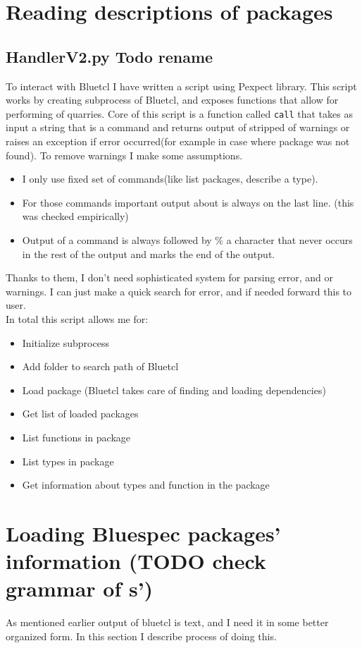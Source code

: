 \documentclass[14pt]{report}
\begin{document}
\section{Reading descriptions of packages}
\subsection{HandlerV2.py Todo rename}
To interact with Bluetcl I have written a script using Pexpect library. This script works by creating subprocess of Bluetcl, and exposes functions that allow for performing of quarries. Core of this script is a function called \verb!call! that takes as input a string that is a command and returns output of stripped of warnings or raises an exception if error occurred(for example in case where package was not found). To remove warnings I make some assumptions.
\begin{itemize}
    \item I only use fixed set of commands(like list packages, describe a type).
    \item For those commands important output about is always on the last line. (this was checked empirically)
    \item Output of a command is always followed by $\%$ a character that never occurs in the rest of the output and marks the end of the output.
\end{itemize}
Thanks to them, I don't need sophisticated system for parsing error, and or warnings. I can just make a quick search for error, and if needed forward this to user.
\\ 
In total this script allows me for:
\begin{itemize}
    \item Initialize subprocess
    \item Add folder to search path of Bluetcl
    \item Load package (Bluetcl takes care of finding and loading dependencies)
    \item Get list of loaded packages
    \item List functions in package
    \item List types in package
    \item Get information about types and function in the package
\end{itemize}

\section{Loading Bluespec packages' information (TODO check grammar of s')}
As mentioned earlier output of bluetcl is text, and I need it in some better organized form. In this section I describe process of doing this.
\end{document}
